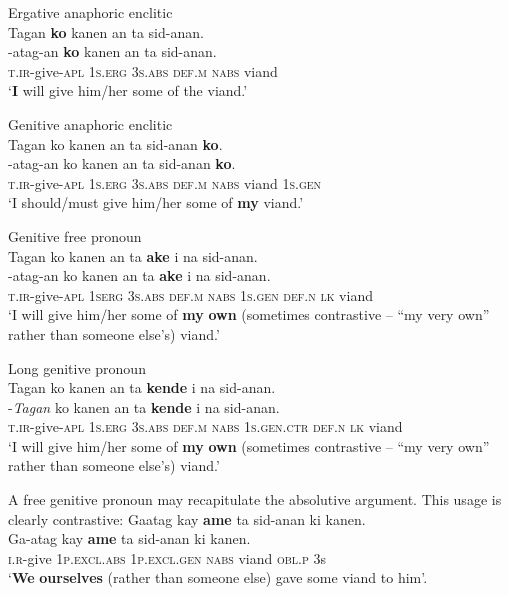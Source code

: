 \ea
Ergative anaphoric enclitic \\
Tagan  \textbf{ko}  kanen  an  ta  sid-anan. \\\smallskip
 \gll \emptyset{}-atag-an  \textbf{ko}  kanen  an  ta  sid-anan. \\
\textsc{t.ir}-give\textsc{-apl}  1\textsc{s.erg}  3\textsc{s.abs}  \textsc{def}.\textsc{m}  \textsc{nabs}  viand \\
\glt ‘\textbf{I} will give him/her some of the viand.’
\z

\ea
Genitive anaphoric enclitic \\
Tagan  ko  kanen  an  ta  sid-anan \textbf{ko}. \\\smallskip
 \gll \emptyset{}-atag-an  ko  kanen  an  ta  sid-anan \textbf{ko}. \\
\textsc{t.ir}-give-\textsc{apl}  1\textsc{s.erg}  3\textsc{s.abs}  \textsc{def.m}  \textsc{nabs}  viand  1\textsc{s.gen} \\
\glt ‘I should/must give him/her some of \textbf{my} viand.’
\z

\ea
Genitive free pronoun \\
Tagan  ko  kanen  an  ta  \textbf{ake}  i  na  sid-anan. \\\smallskip
 \gll \emptyset{}-atag-an  ko  kanen  an  ta  \textbf{ake}  i  na  sid-anan. \\
\textsc{t.ir}-give\textsc{-apl}  \textsc{1serg}  3\textsc{s.abs}  \textsc{def.m}  \textsc{nabs}  1\textsc{s.gen}  \textsc{def.n}  \textsc{lk}  viand \\
\glt ‘I will give him/her some of \textbf{my} \textbf{own} (sometimes contrastive – “my very own” rather than someone else’s) viand.’
\z

\ea
Long genitive pronoun \\
Tagan   ko  kanen  an  ta  \textbf{kende}  i  na  sid-anan. \\\smallskip
 \gll \emptyset{}-\textit{Tagan}   ko  kanen  an  ta  \textbf{kende}  i  na  sid-anan. \\
\textsc{t.ir}-give\textsc{-apl}  1\textsc{s.erg}  3\textsc{s.abs}  \textsc{def.m}  \textsc{nabs}  1\textsc{s.gen.ctr}  \textsc{def.n}  \textsc{lk}  viand \\
\glt ‘I will give him/her some of \textbf{my} \textbf{own} (sometimes contrastive – “my very own” rather than someone else’s) viand.’
\z

A free genitive pronoun may recapitulate the absolutive argument. This usage is clearly contrastive:
\ea
\label{bkm:Ref419117602}
Gaatag  kay   \textbf{ame}  ta  sid-anan  ki  kanen. \\\smallskip
 \gll Ga-atag  kay   \textbf{ame}  ta  sid-anan  ki  kanen. \\
\textsc{i.r-}give  1\textsc{p.excl.abs}  1\textsc{p.excl.gen}  \textsc{nabs}  viand  \textsc{obl.p}  3s \\
\glt ‘\textbf{We} \textbf{ourselves} (rather than someone else) gave some viand to him’.
\z

